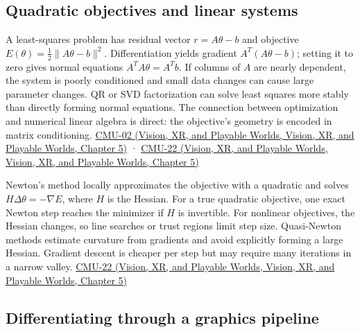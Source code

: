 \subsection{Quadratic objectives and linear systems}\label{04-visual-computing-ii-ch029-quadratic-objectives-and-linear-systems}

A least-squares problem has residual vector \(r=A\theta-b\) and objective \(E(\theta)=\tfrac12\|A\theta-b\|^2\). Differentiation yields gradient \(A^T(A\theta-b)\); setting it to zero gives normal equations \(A^TA\theta=A^Tb\). If columns of \(A\) are nearly dependent, the system is poorly conditioned and small data changes can cause large parameter changes. QR or SVD factorization can solve least squares more stably than directly forming normal equations. The connection between optimization and numerical linear algebra is direct: the objective's geometry is encoded in matrix conditioning. \href{../07-Vision-XR-and-Playable-Worlds/main.pdf\#nameddest=04-visual-computing-ii-ch036-cmu-02---linear-algebra-preview}{CMU-02 (Vision, XR, and Playable Worlds, Vision, XR, and Playable Worlds, Chapter 5)} · \href{../07-Vision-XR-and-Playable-Worlds/main.pdf\#nameddest=04-visual-computing-ii-ch036-cmu-22---optimization}{CMU-22 (Vision, XR, and Playable Worlds, Vision, XR, and Playable Worlds, Chapter 5)}

Newton's method locally approximates the objective with a quadratic and solves \(H\Delta\theta=-\nabla E\), where \(H\) is the Hessian. For a true quadratic objective, one exact Newton step reaches the minimizer if \(H\) is invertible. For nonlinear objectives, the Hessian changes, so line searches or trust regions limit step size. Quasi-Newton methods estimate curvature from gradients and avoid explicitly forming a large Hessian. Gradient descent is cheaper per step but may require many iterations in a narrow valley. \href{../07-Vision-XR-and-Playable-Worlds/main.pdf\#nameddest=04-visual-computing-ii-ch036-cmu-22---optimization}{CMU-22 (Vision, XR, and Playable Worlds, Vision, XR, and Playable Worlds, Chapter 5)}

\subsection{Differentiating through a graphics pipeline}\label{04-visual-computing-ii-ch029-differentiating-through-a-graphics-pipeline}

